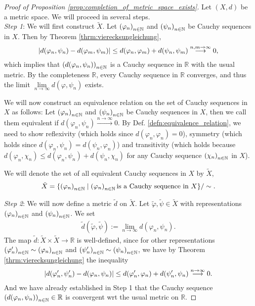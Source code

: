 \begin{proof}[Proof of Proposition \ref{prop:completion_of_metric_space_exists}]
	Let $(X, d)$ be a metric space. We will proceed in several steps. 
	\\
	
	\textit{Step 1}: We will first construct $\tilde{X}$. Let $\seq[\varphi_n]$ and $\seq[\psi_n]$ be Cauchy sequences in $X$. Then by Theorem \ref{thrm:vierecksungleichung}, 
	\begin{align}
		\abs{d(\varphi_n, \psi_n) - d(\varphi_m, \psi_m)} \leq d(\varphi_n, \varphi_m) + d(\psi_n, \psi_m) \overset{n, m\to\infty}{\longrightarrow} 0,
	\end{align}
	which implies that $\seq[d(\varphi_n, \psi_n)]$ is a Cauchy sequence in $\mathbb R$ with the usual metric. By the completeness $\mathbb R$, every Cauchy sequence in $\mathbb R$ converges, and thus the limit $\lim\limits_{n\to\infty}d(\varphi, \psi_n)$ exists.
	
	We will now construct an equivalence relation on the set of Cauchy sequences in $X$ as follows: Let $\seq[\varphi_n]$ and $\seq[\psi_n]$ be Cauchy sequences in $X$, then we call them equivalent if $d(\varphi_n, \psi_n) \overset{n\to\infty}{\longrightarrow} 0$. By Def. \ref{defn:equivalence_relation}, we need to show reflexivity (which holds since $d(\varphi_n, \varphi_n) = 0$), symmetry (which holds since $d(\varphi_n, \psi_n) = d(\psi_n, \varphi_n)$) and transitivity (which holds because $d(\varphi_n, \chi_n) \leq d(\varphi_n, \psi_n) + d(\psi_n, \chi_n)$ for any Cauchy sequence $\seq[\chi_n]$ in $X$). 
	
	We will denote the set of all equivalent Cauchy sequences in $X$ by $\tilde{X}$,
	\begin{align}
		\tilde{X} = \{ \seq[\varphi_n] \mid \seq[\varphi_n] \text{is a Cauchy sequence in } X \} / \sim.
	\end{align}
	
	\textit{Step 2}: We will now define a metric $\tilde{d}$ on $\tilde{X}$. Let $\tilde{\varphi}, \tilde{\psi}\in\tilde{X}$ with representations $\seq[\varphi_n]$ and $\seq[\psi_n]$. We set 
	\begin{align}
		\tilde{d}\left(\tilde{\varphi}, \tilde{\psi}\right) := \lim\limits_{n\to\infty}d(\varphi_n, \psi_n).
	\end{align}
	The map $\tilde{d}: \tilde{X}\times\tilde{X}\to\mathbb R$ is well-defined, since for other representations $\seq[\varphi'_n] \sim \seq[\varphi_n]$ and $\seq[\psi'_n]\sim\seq[\psi_n]$, we have by Theorem \ref{thrm:vierecksungleichung} the inequality
	\begin{align}
		\abs{d(\varphi_n', \psi_n') - d(\varphi_n, \psi_n)} \leq d(\varphi_n', \varphi_n) + d(\psi_n', \psi_n) \overset{n\to\infty}{\longrightarrow} 0.
	\end{align}
	And we have already established in Step 1 that the Cauchy sequence $\seq[d(\varphi_n, \psi_n)]\in\mathbb R$ is convergent wrt the usual metric on $\mathbb R$.
	

\end{proof}
